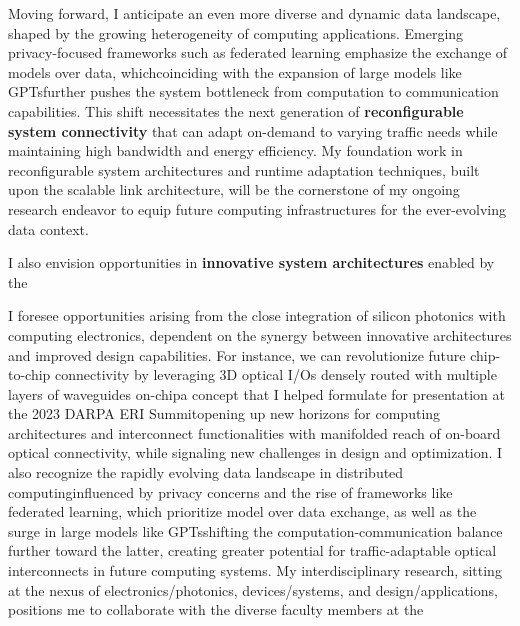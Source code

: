 Moving forward, I anticipate an even more diverse and dynamic data landscape, shaped by the growing heterogeneity of computing applications. Emerging privacy-focused frameworks such as federated learning emphasize the exchange of models over data, which\textemdash coinciding with the expansion of large models like GPTs\textemdash further pushes the system bottleneck from computation to communication capabilities. This shift necessitates the next generation of \textbf{reconfigurable system connectivity} that can adapt on-demand to varying traffic needs while maintaining high bandwidth and energy efficiency. My foundation work in reconfigurable system architectures and runtime adaptation techniques, built upon the scalable link architecture, will be the cornerstone of my ongoing research endeavor to equip future computing infrastructures for the ever-evolving data context.

I also envision opportunities in \textbf{innovative system architectures} enabled by the



I foresee opportunities arising from the close integration of silicon photonics with computing electronics, dependent on the synergy between innovative architectures and improved design capabilities. For instance, we can revolutionize future chip-to-chip connectivity by leveraging 3D optical I/Os densely routed with multiple layers of waveguides on-chip\textemdash a concept that I helped formulate for presentation at the 2023 DARPA ERI Summit\textemdash opening up new horizons for
computing architectures and interconnect functionalities with manifolded reach of on-board optical connectivity, while signaling new challenges in design and optimization. I also recognize the rapidly evolving data landscape in distributed computing\textemdash influenced by privacy concerns and the rise of frameworks like federated learning, which prioritize model over data exchange, as well as the surge in large models like GPTs\textemdash shifting the computation-communication balance further toward the latter, creating greater potential for traffic-adaptable optical interconnects in future computing systems. My interdisciplinary research, sitting at the nexus of electronics/photonics, devices/systems, and design/applications, positions me to collaborate with the diverse faculty members at the \appSchool{}%